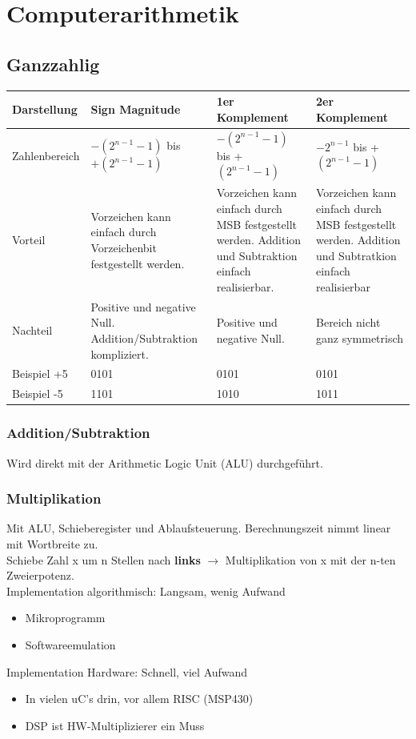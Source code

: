 \section{Computerarithmetik}

\subsection{Ganzzahlig}
\begin{tabular}{|p{3cm}|p{4.5cm}|p{4.5cm}|p{4.5cm}|}
	\hline
	Darstellung & Sign Magnitude & 1er Komplement & 2er Komplement\\
	\hline
	Zahlenbereich & $-(2^{n-1}-1)$ bis $+(2^{n-1}-1)$ & $-(2^{n-1}-1)$ bis +$(2^{n-1}-1)$ & $-2^{n-1}$ bis +$(2^{n-1}-1)$\\
	\hline
	Vorteil & Vorzeichen kann einfach durch Vorzeichenbit festgestellt werden. & Vorzeichen kann einfach durch MSB festgestellt werden. Addition und Subtraktion einfach realisierbar. & Vorzeichen kann einfach durch MSB festgestellt werden. Addition und Subtratkion einfach realisierbar \\ 
	\hline
	Nachteil & Positive und negative Null. Addition/Subtraktion kompliziert. & Positive und negative Null. & Bereich nicht ganz symmetrisch\\
	\hline
	Beispiel +5 & 0101 & 0101 & 0101 \\
	Beispiel -5 & 1101 & 1010 & 1011 \\
	\hline
\end{tabular}

\subsubsection{Addition/Subtraktion}
Wird direkt mit der Arithmetic Logic Unit (ALU) durchgeführt.

\subsubsection{Multiplikation}





Mit ALU, Schieberegister und Ablaufsteuerung. Berechnungszeit nimmt linear mit Wortbreite zu.\\ Schiebe Zahl x um n Stellen nach \textbf{links} $\rightarrow$ Multiplikation von x mit der n-ten Zweierpotenz. \\
Implementation algorithmisch: Langsam, wenig Aufwand
\begin{itemize}
	\item Mikroprogramm
	\item Softwareemulation
\end{itemize}
Implementation Hardware: Schnell, viel Aufwand
\begin{itemize}
	\item In vielen uC's drin, vor allem RISC (MSP430)
	\item DSP ist HW-Multiplizierer ein Muss
\end{itemize}
